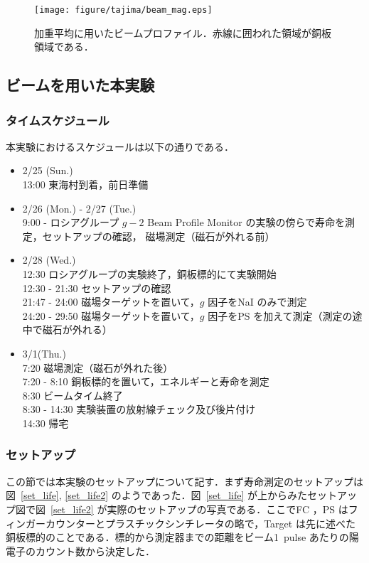 \begin{figure}[H]
\centering
\texttt{[image: figure/tajima/beam\_mag.eps]}
\caption{加重平均に用いたビームプロファイル．赤線に囲われた領域が銅板領域である．}
\label{beam_mag}
\end{figure}

\newpage

\subsection{ビームを用いた本実験}

\subsubsection{タイムスケジュール}
本実験におけるスケジュールは以下の通りである．
\begin{itemize}
\item 2/25 (Sun.)\\
13:00   東海村到着，前日準備
\item 2/26 (Mon.) - 2/27 (Tue.)\\
9:00 - ロシアグループ $g - 2$ Beam Profile Monitor の実験の傍らで寿命を測定，セットアップの確認， 磁場測定（磁石が外れる前）
\item 2/28 (Wed.)\\
12:30  \phantom{-} ロシアグループの実験終了，銅板標的にて実験開始\\ 
12:30 - 21:30 セットアップの確認\\
21:47 - 24:00 磁場ターゲットを置いて，$g$ 因子をNaI のみで測定\\
24:20 - 29:50 磁場ターゲットを置いて，$g$ 因子をPS を加えて測定（測定の途中で磁石が外れる）
\item 3/1(Thu.)\\
7:20 \phantom{-} 磁場測定（磁石が外れた後）\\
7:20 - 8:10 銅板標的を置いて，エネルギーと寿命を測定\\
8:30 \phantom{-} ビームタイム終了\\
8:30 - 14:30 実験装置の放射線チェック及び後片付け \\
14:30 帰宅
\end{itemize}

\subsubsection{セットアップ}
この節では本実験のセットアップについて記す．まず寿命測定のセットアップは図~\ref{set_life}, \ref{set_life2} のようであった．図~\ref{set_life} が上からみたセットアップ図で図~\ref{set_life2} が実際のセットアップの写真である．ここでFC ，PS はフィンガーカウンターとプラスチックシンチレータの略で，Target は先に述べた銅板標的のことである．標的から測定器までの距離をビーム1~pulse あたりの陽電子のカウント数から決定した．

